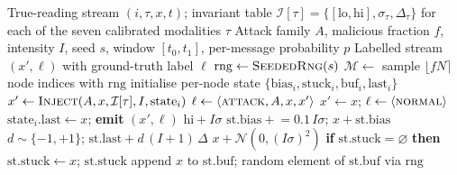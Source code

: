 \documentclass[jsan,article,submit,moreauthors,pdftex]{Definitions/mdpi}
\begin{document}
\begin{algorithm}[H]
\caption{Labelled Physical-Invariant Anomaly Injection}
\label{alg:anomaly_injection}
\begin{algorithmic}[1]
\Require True-reading stream $(i,\tau,x,t)$; invariant table $\mathcal{I}[\tau]=\{[\mathrm{lo},\mathrm{hi}],\sigma_\tau,\Delta_\tau\}$ for each of the seven calibrated modalities $\tau$
\Require Attack family $A$, malicious fraction $f$, intensity $I$, seed $s$, window $[t_0,t_1]$, per-message probability $p$
\Ensure Labelled stream $(x',\ell)$ with ground-truth label $\ell$
\State $\mathrm{rng} \leftarrow \textsc{SeededRng}(s)$ 
\State $\mathcal{M} \leftarrow$ sample $\lfloor f N \rceil$ node indices with $\mathrm{rng}$ 
\State initialise per-node state $\{\mathrm{bias}_i, \mathrm{stuck}_i, \mathrm{buf}_i, \mathrm{last}_i\}$
        \State $x' \leftarrow \textsc{Inject}(A, x, \mathcal{I}[\tau], I, \mathrm{state}_i)$
        \State $\ell \leftarrow \langle \textsc{attack}, A, x, x' \rangle$ 
    \Else
        \State $x' \leftarrow x$; \quad $\ell \leftarrow \langle \textsc{normal} \rangle$
    \EndIf
    \State $\mathrm{state}_i.\mathrm{last} \leftarrow x$; \quad \textbf{emit } $(x',\ell)$
\EndFor
\Statex
{}
        \State \Return $\mathrm{hi} + I\sigma$ 
        \State $\mathrm{st.bias} \mathrel{+}= 0.1\,I\sigma$; \quad \Return $x + \mathrm{st.bias}$ 
        \State $d \sim \{-1,+1\}$; \quad \Return $\mathrm{st.last} + d\,(I{+}1)\,\Delta$ 
        \State \Return $x + \mathcal{N}(0,(I\sigma)^2)$ 
        \State \textbf{if} $\mathrm{st.stuck} = \varnothing$ \textbf{then} $\mathrm{st.stuck} \leftarrow x$; \quad \Return $\mathrm{st.stuck}$
        \State append $x$ to $\mathrm{st.buf}$; \quad \Return random element of $\mathrm{st.buf}$ via $\mathrm{rng}$
    \EndIf
\EndFunction
\end{algorithmic}
\end{algorithm}
\end{document}

